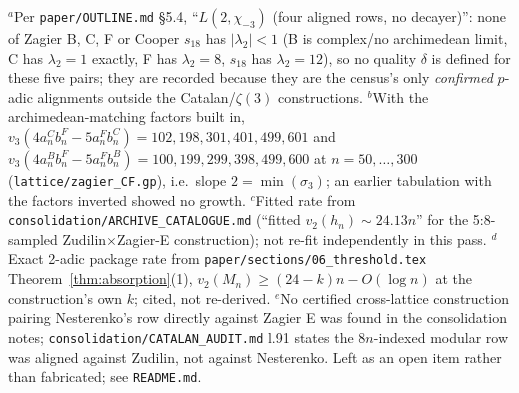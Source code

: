 \begin{table}[t]
\vspace{2mm}
\footnotesize
$^{a}$Per \texttt{paper/OUTLINE.md} \S5.4, ``$L(2,\chi_{-3})$ (four aligned rows, no decayer)'':
none of Zagier B, C, F or Cooper $s_{18}$ has $|\lambda_2|<1$ (B is complex/no archimedean limit,
C has $\lambda_2{=}1$ exactly, F has $\lambda_2{=}8$, $s_{18}$ has $\lambda_2{=}12$), so no quality
$\delta$ is defined for these five pairs; they are recorded because they are the census's only
\emph{confirmed} $p$-adic alignments outside the Catalan/$\zeta(3)$ constructions.
$^{b}$With the archimedean-matching factors built in, $v_3(4a^C_nb^F_n-5a^F_nb^C_n)=102,198,301,401,499,601$ and $v_3(4a^B_nb^F_n-5a^F_nb^B_n)=100,199,299,398,499,600$ at $n=50,\ldots,300$ (\texttt{lattice/zagier\_CF.gp}), i.e.\ slope $2=\min(\sigma_3)$; an earlier tabulation with the factors inverted showed no growth.
$^{c}$Fitted rate from \texttt{consolidation/ARCHIVE\_CATALOGUE.md} (``fitted $v_2(h_n)\sim24.13n$''
for the 5:8-sampled Zudilin$\times$Zagier-E construction); not re-fit independently in this pass.
$^{d}$Exact 2-adic package rate from \texttt{paper/sections/06\_threshold.tex} Theorem~\ref{thm:absorption}(1),
$v_2(M_n)\ge(24-k)n-O(\log n)$ at the construction's own $k$; cited, not re-derived.
$^{e}$No certified cross-lattice construction pairing Nesterenko's row directly against Zagier E
was found in the consolidation notes; \texttt{consolidation/CATALAN\_AUDIT.md} l.91 states the
$8n$-indexed modular row was aligned against Zudilin, not against Nesterenko. Left as an open
item rather than fabricated; see \texttt{README.md}.
\end{table}
